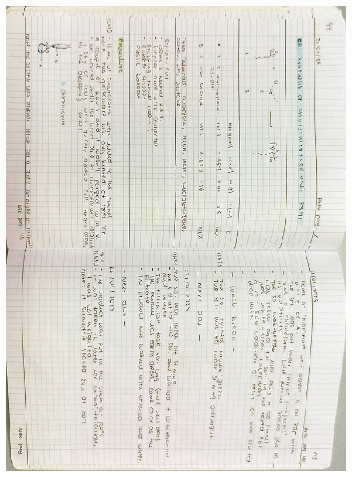 \begin{figure}[H]
	\centering
	\includegraphics[width=0.6\linewidth, angle=90]{../images/compressed/IMG20250123173118.jpg}
\end{figure}


